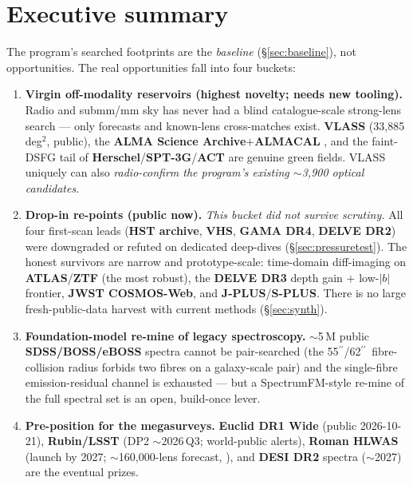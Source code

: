 \documentclass[11pt,letterpaper]{article}
\providecommand{\arcsec}{\ensuremath{^{\prime\prime}}}
\newcommand{\survey}[1]{\textbf{#1}}
\begin{document}
\section{Executive summary}
The program's searched footprints are the \emph{baseline} (\S\ref{sec:baseline}), not
opportunities. The real opportunities fall into four buckets:
\begin{enumerate}[noitemsep]
  \item \textbf{Virgin off-modality reservoirs (highest novelty; needs new tooling).} Radio and
  submm/mm sky has never had a blind catalogue-scale strong-lens search --- only forecasts
  \citep{mckean2008,mccarty2024} and known-lens cross-matches \citep{martinez2024vlass} exist.
  \survey{VLASS} (33{,}885\,deg$^2$, public), the \survey{ALMA Science Archive}$+$\survey{ALMACAL}
  \citep{oteo2016almacal}, and the faint-DSFG tail of \survey{Herschel}/\survey{SPT-3G}/\survey{ACT}
  are genuine green fields. VLASS uniquely can also \emph{radio-confirm the program's existing
  $\sim$3{,}900 optical candidates}.
  \item \textbf{Drop-in re-points (public now).} \emph{This bucket did not survive scrutiny.} All
  four first-scan leads (\survey{HST archive}, \survey{VHS}, \survey{GAMA DR4}, \survey{DELVE DR2})
  were downgraded or refuted on dedicated deep-dives (\S\ref{sec:pressuretest}). The honest
  survivors are narrow and prototype-scale: time-domain diff-imaging on \survey{ATLAS}/\survey{ZTF}
  (the most robust), the \survey{DELVE DR3} depth gain $+$ low-$|b|$ frontier, \survey{JWST
  COSMOS-Web}, and \survey{J-PLUS}/\survey{S-PLUS}. There is no large fresh-public-data harvest with
  current methods (\S\ref{sec:synth}).
  \item \textbf{Foundation-model re-mine of legacy spectroscopy.} $\sim$5\,M public
  \survey{SDSS/BOSS/eBOSS} spectra cannot be pair-searched (the 55\arcsec/62\arcsec\
  fibre-collision radius forbids two fibres on a galaxy-scale pair) and the single-fibre
  emission-residual channel is exhausted \citep{bolton2006,brownstein2012,shu2017,talbot2021} ---
  but a SpectrumFM-style re-mine of the full spectral set is an open, build-once lever.
  \item \textbf{Pre-position for the megasurveys.} \survey{Euclid DR1 Wide} (public 2026-10-21),
  \survey{Rubin/LSST} (DP2 $\sim$2026\,Q3; world-public alerts), \survey{Roman HLWAS} (launch by
  2027; $\sim$160{,}000-lens forecast, \citealt{holloway2025roman}), and \survey{DESI DR2} spectra
  ($\sim$2027) are the eventual prizes.
\end{enumerate}
\end{document}
